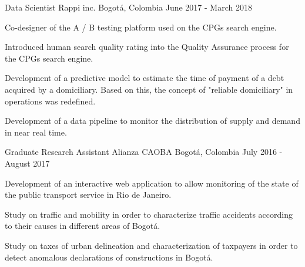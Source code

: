 \begin{cventries}
    \cventry
    {Data Scientist} %
    {Rappi inc.} %
    {Bogotá, Colombia} %
    {June 2017 - March 2018} %
    {
        \begin{cvitems}
        \item{Co-designer of the A / B testing platform used on the CPGs search engine.}
        \item{Introduced human search quality rating into the Quality Assurance process for the CPGs search engine.}
        \item{Development of a predictive model to estimate the time of payment of a debt acquired by a domiciliary. Based on this, the concept of "reliable domiciliary" in operations was redefined.}
        \item{Development of a data pipeline to monitor the distribution of supply and demand in near real time.}
        \end{cvitems}
    } %


    \cventry
    {Graduate Research Assistant} %
    {Alianza CAOBA} %
    {Bogotá, Colombia} %
    {July 2016 - August 2017} %
    {
        \begin{cvitems}
        \item{Development of an interactive web application to allow monitoring of the state of the public transport service in Rio de Janeiro.}
        \item{Study on traffic and mobility in order to characterize traffic accidents according to their causes in different areas of Bogotá.}
        \item{Study on taxes of urban delineation and characterization of taxpayers in order to detect anomalous declarations of constructions in Bogotá.}
        \end{cvitems}
    } %


    \vspace{-0.5cm}
\end{cventries}
